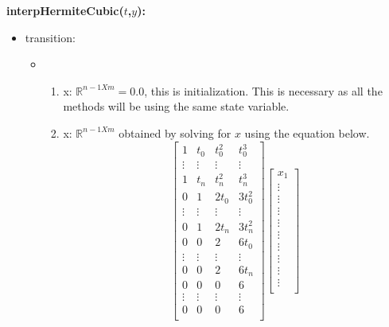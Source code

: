 \documentclass[12pt, titlepage]{article}
\begin{document}
\noindent \textbf{interpHermiteCubic($t$,$y$):}
\begin{itemize}
	\item transition: 
	
	\begin{itemize}
		\item 
		\begin{enumerate}
			\item x: $\mathbb{R}^{n-1 X m} = 0.0 $, this is initialization. 
			This is necessary as all the methods will be using the same state 
			variable.
			
			\item x: $\mathbb{R}^{n-1 X m}$ obtained by solving for $x$ using 
			the equation below.
		\begin{equation*}
		\begin{bmatrix}
		1          & t_0       & t_0 ^{2}         & t_0 ^{3}         \\
		\vdots     & \vdots    & \vdots           & \vdots            \\
		1          & t_n       & t_n ^{2}         & t_n ^{3}          \\
		0          & 1         & 2 t_0            & 3 t_0 ^{2}         \\
		\vdots     & \vdots    & \vdots           & \vdots            \\
		0          & 1         & 2 t_n            & 3 t_n ^{2}          \\
		0          & 0         & 2                & 6 t_0              \\
		\vdots     & \vdots    & \vdots           & \vdots            \\
		0          & 0         & 2                & 6 t_n           \\
		0          & 0         & 0                & 6                 \\
		\vdots     & \vdots    & \vdots           & \vdots            \\
		0          & 0         & 0                & 6               \\
		\end{bmatrix}
		\begin{bmatrix}
		x_1  \\
		\vdots \\
		\vdots \\
		\vdots \\
		\vdots \\
		\vdots \\
		\vdots \\
		\vdots \\
		\vdots \\
		\vdots \\
		

\end{bmatrix}
\end{equation*}
\end{enumerate}
\end{itemize}
\end{itemize}
\end{document}
